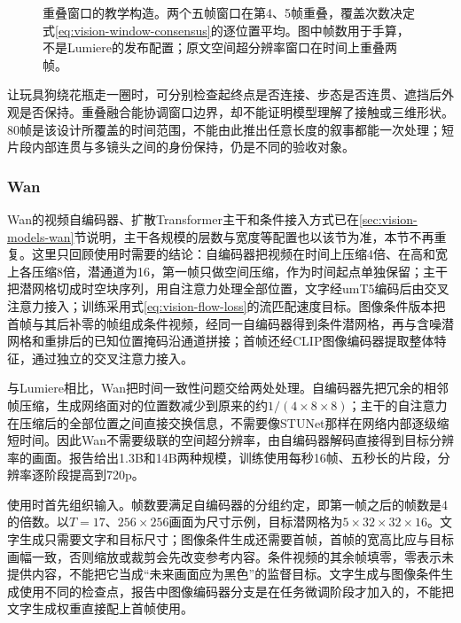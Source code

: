 \begin{figure}[htbp]
  \centering
  
  \caption{重叠窗口的教学构造。两个五帧窗口在第4、5帧重叠，覆盖次数决定式\eqref{eq:vision-window-consensus}的逐位置平均。图中帧数用于手算，不是Lumiere的发布配置；原文空间超分辨率窗口在时间上重叠两帧。}
  \label{fig:vision-window-consensus}
\end{figure}
\FloatBarrier

让玩具狗绕花瓶走一圈时，可分别检查起终点是否连接、步态是否连贯、遮挡后外观是否保持。重叠融合能协调窗口边界，却不能证明模型理解了接触或三维形状。80帧是该设计所覆盖的时间范围，不能由此推出任意长度的叙事都能一次处理；短片段内部连贯与多镜头之间的身份保持，仍是不同的验收对象。

\Needspace{60mm}
\subsubsection{Wan}
\label{sec:vision-multigen-wan}

Wan的视频自编码器、扩散Transformer主干和条件接入方式已在\ref{sec:vision-models-wan}节说明，主干各规模的层数与宽度等配置也以该节为准，本节不再重复。这里只回顾使用时需要的结论：自编码器把视频在时间上压缩4倍、在高和宽上各压缩8倍，潜通道为16，第一帧只做空间压缩，作为时间起点单独保留；主干把潜网格切成时空块序列，用自注意力处理全部位置，文字经umT5编码后由交叉注意力接入；训练采用式\eqref{eq:vision-flow-loss}的流匹配速度目标。图像条件版本把首帧与其后补零的帧组成条件视频，经同一自编码器得到条件潜网格，再与含噪潜网格和重排后的已知位置掩码沿通道拼接；首帧还经CLIP图像编码器提取整体特征，通过独立的交叉注意力接入。

与Lumiere相比，Wan把时间一致性问题交给两处处理。自编码器先把冗余的相邻帧压缩，生成网络面对的位置数减少到原来的约$1/(4\times8\times8)$；主干的自注意力在压缩后的全部位置之间直接交换信息，不需要像STUNet那样在网络内部逐级缩短时间。因此Wan不需要级联的空间超分辨率，由自编码器解码直接得到目标分辨率的画面。报告给出1.3B和14B两种规模，训练使用每秒16帧、五秒长的片段，分辨率逐阶段提高到720p。

使用时首先组织输入。帧数要满足自编码器的分组约定，即第一帧之后的帧数是4的倍数。以$T=17$、$256\times256$画面为尺寸示例，目标潜网格为$5\times32\times32\times16$。文字生成只需要文字和目标尺寸；图像条件生成还需要首帧，首帧的宽高比应与目标画幅一致，否则缩放或裁剪会先改变参考内容。条件视频的其余帧填零，零表示未提供内容，不能把它当成“未来画面应为黑色”的监督目标。文字生成与图像条件生成使用不同的检查点，报告中图像编码器分支是在任务微调阶段才加入的，不能把文字生成权重直接配上首帧使用。

